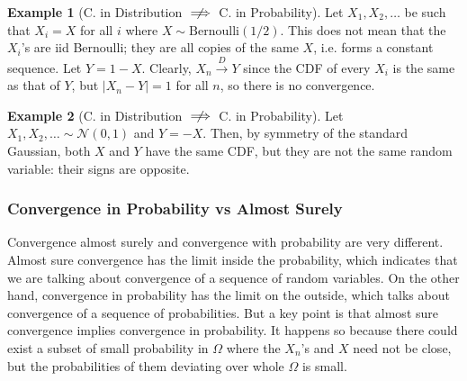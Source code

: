 \documentclass{article}
\theoremstyle{definition}
\newtheorem{example}{Example}[section]
\theoremstyle{remark}
\theoremstyle{definition}
\begin{document}
\begin{example}[C. in Distribution $\centernot\implies$ C. in Probability]
Let $X_1, X_2, \ldots$ be such that $X_i = X$ for all $i$ where $X \sim \mathrm{Bernoulli}(1/2)$. This does not mean that the $X_i$'s are iid Bernoulli; they are all copies of the same $X$, i.e. forms a constant sequence. Let $Y = 1 - X$. Clearly, $X_n \xrightarrow{D} Y$ since the CDF of every $X_i$ is the same as that of $Y$, but $|X_n - Y| = 1$ for all $n$, so there is no convergence.  
\end{example}

\begin{example}[C. in Distribution $\centernot\implies$ C. in Probability]
Let $X_1, X_2, \ldots \sim \mathcal{N}(0, 1)$ and $Y = -X$. Then, by symmetry of the standard Gaussian, both $X$ and $Y$ have the same CDF, but they are not the same random variable: their signs are opposite. 
\end{example}

\subsubsection{Convergence in Probability vs Almost Surely} 

Convergence almost surely and convergence with probability are very different. Almost sure convergence has the limit inside the probability, which indicates that we are talking about convergence of a sequence of random variables. On the other hand, convergence in probability has the limit on the outside, which talks about convergence of a sequence of probabilities. But a key point is that almost sure convergence implies convergence in probability. It happens so because there could exist a subset of small probability in $\Omega$ where the $X_n$'s and $X$ need not be close, but the probabilities of them deviating over whole $\Omega$ is small. 
\end{document}
